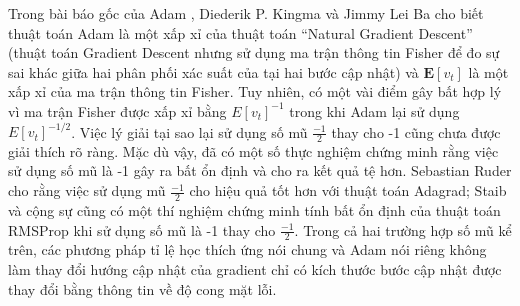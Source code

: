 Trong bài báo gốc của Adam\cite{kingma2014adam} , Diederik P. Kingma và Jimmy Lei Ba cho biết thuật toán Adam là một xấp xỉ của thuật toán ``Natural Gradient Descent'' (thuật toán Gradient Descent nhưng sử dụng ma trận thông tin Fisher để đo sự sai khác giữa hai phân phối xác suất của tại hai bước cập nhật) và $\mathbf{E}[v_t]$ là một xấp xỉ của ma trận thông tin Fisher. Tuy nhiên, có một vài điểm gây bất hợp lý vì ma trận Fisher được xấp xỉ bằng $E[v_t]^{-1}$ trong khi Adam lại sử dụng $E[v_t]^{-1/2}$. Việc lý giải tại sao lại sử dụng số mũ $\frac{-1}{2}$ thay cho -1 cũng chưa được giải thích rõ ràng. Mặc dù vậy, đã có một số thực nghiệm chứng minh rằng việc sử dụng số mũ là -1 gây ra bất ổn định và cho ra kết quả tệ hơn. Sebastian Ruder cho rằng việc sử dụng mũ $\frac{-1}{2}$ cho hiệu quả tốt hơn với thuật toán Adagrad\cite{ruder2016overview}; Staib và cộng sự cũng có một thí nghiệm chứng minh tính bất ổn định của thuật toán RMSProp khi sử dụng số mũ là -1 thay cho $\frac{-1}{2}$\cite{staib2019sscapingsp}. Trong cả hai trường hợp số mũ kể trên, các phương pháp tỉ lệ học thích ứng nói chung và Adam nói riêng không làm thay đổi hướng cập nhật của gradient chỉ có kích thước bước cập nhật được thay đổi bằng thông tin về độ cong mặt lỗi\cite{staib2019sscapingsp}.